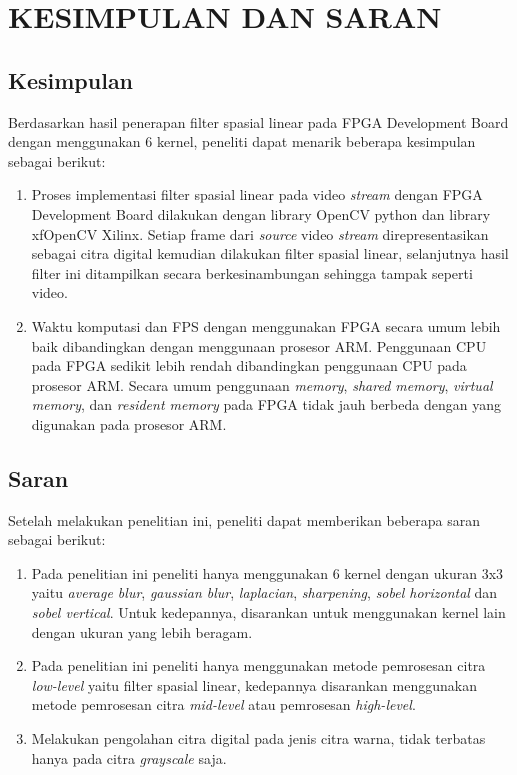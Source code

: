 
\chapter{KESIMPULAN DAN SARAN}

\section{Kesimpulan}
Berdasarkan hasil penerapan filter spasial linear pada FPGA Development Board dengan menggunakan 6 kernel, peneliti dapat menarik beberapa kesimpulan sebagai berikut:
\begin{enumerate}[topsep=0pt,itemsep=0pt,partopsep=0pt, parsep=0pt]
    \item Proses implementasi filter spasial linear pada video \textit{stream} dengan FPGA Development Board dilakukan dengan library OpenCV python dan library xfOpenCV Xilinx. Setiap frame dari \textit{source} video \textit{stream} direpresentasikan sebagai citra digital kemudian dilakukan filter spasial linear, selanjutnya hasil filter ini ditampilkan secara berkesinambungan sehingga tampak seperti video.
    \item Waktu komputasi dan FPS dengan menggunakan FPGA secara umum lebih baik dibandingkan dengan menggunaan prosesor ARM. Penggunaan CPU pada FPGA sedikit lebih rendah dibandingkan penggunaan CPU pada prosesor ARM. Secara umum penggunaan \textit{memory}, \textit{shared memory}, \textit{virtual memory}, dan \textit{resident memory} pada FPGA tidak jauh berbeda dengan yang digunakan pada prosesor ARM.
\end{enumerate}


\section{Saran}
Setelah melakukan penelitian ini, peneliti dapat memberikan beberapa saran sebagai berikut:
\begin{enumerate}[topsep=0pt,itemsep=0pt,partopsep=0pt, parsep=0pt]
    \item Pada penelitian ini peneliti hanya menggunakan 6 kernel dengan ukuran 3x3 yaitu \textit{average blur}, \textit{gaussian blur}, \textit{laplacian}, \textit{sharpening}, \textit{sobel horizontal} dan \textit{sobel vertical}. Untuk kedepannya, disarankan untuk menggunakan kernel lain dengan ukuran yang lebih beragam.
    \item Pada penelitian ini peneliti hanya menggunakan metode pemrosesan citra \textit{low-level} yaitu filter spasial linear, kedepannya disarankan menggunakan metode pemrosesan citra \textit{mid-level} atau pemrosesan \textit{high-level}.
    \item Melakukan pengolahan citra digital pada jenis citra warna, tidak terbatas hanya pada citra \textit{grayscale} saja.
\end{enumerate}